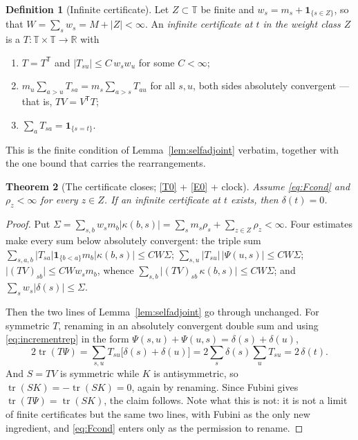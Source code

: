 \documentclass[11pt,a4paper]{article}
\theoremstyle{plain}
\newtheorem{theorem}{Theorem}[section]
\theoremstyle{definition}
\newtheorem{definition}[theorem]{Definition}
\theoremstyle{remark}
\newcommand{\R}{\mathbb{R}}
\newcommand{\T}{\mathbb{T}}                     %
\newcommand{\one}{\mathbf{1}}
\begin{document}
\begin{definition}[Infinite certificate]
  \label{def:certificate}
  Let $Z \subset \T$ be finite and $w_s = m_s + \one_{\{s \in Z\}}$, so that
  $W = \sum_s w_s = M + \lvert Z\rvert < \infty$.  An \emph{infinite certificate
  at $t$ in the weight class $Z$} is a $T : \T \times \T \to \R$ with
  \begin{enumerate}[label=(\roman*)]
  \item $T = T^{\mathsf T}$ and $\lvert T_{su}\rvert \leq C\,w_s w_u$ for some
    $C < \infty$;
  \item $m_u \sum_{a > u} T_{sa} = m_s \sum_{a > s} T_{au}$ for all $s,u$, both
    sides absolutely convergent --- that is, $TV = V^{\mathsf T} T$;
  \item $\sum_a T_{sa} = \one_{\{s = t\}}$.
  \end{enumerate}
  This is the finite condition of Lemma~\ref{lem:selfadjoint} verbatim, together
  with the one bound that carries the rearrangements.
\end{definition}

\begin{theorem}[The certificate closes; \eqref{T0} + \eqref{E0} + clock]
  \label{thm:certificate}
  Assume \eqref{eq:Fcond} and $\rho_z < \infty$ for every $z \in Z$.  If an
  infinite certificate at $t$ exists, then $\delta(t) = 0$.
\end{theorem}

\begin{proof}
  Put $\Sigma = \sum_{s,b} w_s m_b \lvert\kappa(b,s)\rvert
  = \sum_s m_s \rho_s + \sum_{z \in Z} \rho_z < \infty$.  Four estimates make
  every sum below absolutely convergent: the triple sum
  $\sum_{s,a,b} \lvert T_{sa}\rvert \one_{\{b<a\}} m_b \lvert\kappa(b,s)\rvert
  \leq C W \Sigma$; $\sum_{s,u} \lvert T_{su}\rvert\,\lvert\Psi(u,s)\rvert
  \leq C W \Sigma$; $\lvert (TV)_{sb}\rvert \leq C W w_s m_b$, whence
  $\sum_{s,b} \lvert (TV)_{sb}\,\kappa(b,s)\rvert \leq C W \Sigma$; and
  $\sum_s w_s \lvert\delta(s)\rvert \leq \Sigma$.

  Then the two lines of Lemma~\ref{lem:selfadjoint} go through unchanged.  For
  symmetric $T$, renaming in an absolutely convergent double sum and using
  \eqref{eq:incrementrep} in the form
  $\Psi(s,u) + \Psi(u,s) = \delta(s) + \delta(u)$,
  \[
    2\operatorname{tr}(T\Psi)
      = \sum_{s,u} T_{su}\bigl[\delta(s) + \delta(u)\bigr]
      = 2 \sum_s \delta(s) \sum_u T_{su}
      = 2\,\delta(t) .
  \]
  And $S = TV$ is symmetric while $K$ is antisymmetric, so
  $\operatorname{tr}(SK) = -\operatorname{tr}(SK) = 0$, again by renaming.  Since
  Fubini gives $\operatorname{tr}(T\Psi) = \operatorname{tr}(SK)$, the claim
  follows.  Note what this is not: it is not a limit of finite certificates but
  the same two lines, with Fubini as the only new ingredient, and
  \eqref{eq:Fcond} enters only as the permission to rename.
\end{proof}
\end{document}
